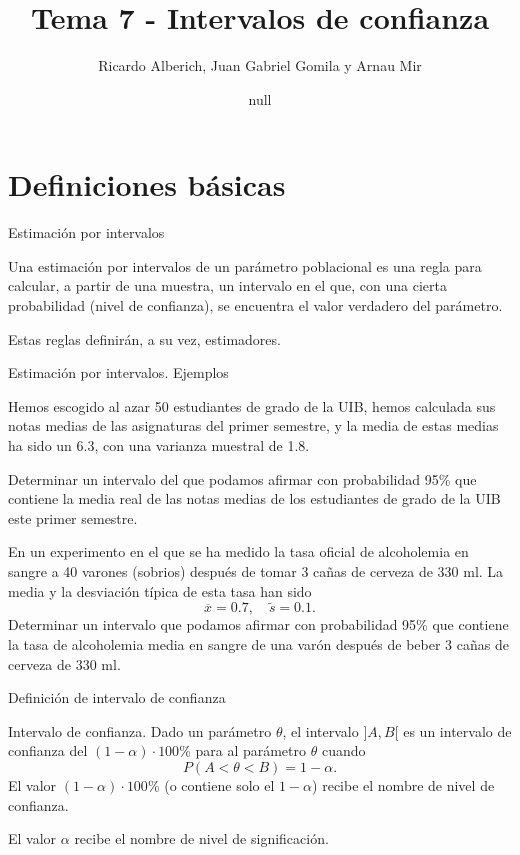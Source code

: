 \documentclass[ignorenonframetext,]{beamer}
\title{Tema 7 - Intervalos de confianza}
\author{Ricardo Alberich, Juan Gabriel Gomila y Arnau Mir}
\date{null}
\begin{document}
\frame{\titlepage}

\hypertarget{definiciones-basicas}{%
\section{Definiciones básicas}\label{definiciones-basicas}}

\begin{frame}{Estimación por intervalos}
\protect\hypertarget{estimacion-por-intervalos}{}

Una estimación por intervalos de un parámetro poblacional es una regla
para calcular, a partir de una muestra, un intervalo en el que, con una
cierta probabilidad (nivel de confianza), se encuentra el valor
verdadero del parámetro.

Estas reglas definirán, a su vez, estimadores.

\end{frame}

\begin{frame}{Estimación por intervalos. Ejemplos}
\protect\hypertarget{estimacion-por-intervalos.-ejemplos}{}

Hemos escogido al azar 50 estudiantes de grado de la UIB, hemos
calculada sus notas medias de las asignaturas del primer semestre, y la
media de estas medias ha sido un 6.3, con una varianza muestral de 1.8.

Determinar un intervalo del que podamos afirmar con probabilidad 95\%
que contiene la media real de las notas medias de los estudiantes de
grado de la UIB este primer semestre.

En un experimento en el que se ha medido la tasa oficial de alcoholemia
en sangre a 40 varones (sobrios) después de tomar 3 cañas de cerveza de
330 ml. La media y la desviación típica de esta tasa han sido \[
\overline{x}=0.7,\quad \widetilde{s}=0.1.
\] Determinar un intervalo que podamos afirmar con probabilidad 95\% que
contiene la tasa de alcoholemia media en sangre de una varón después de
beber 3 cañas de cerveza de 330 ml.

\end{frame}

\begin{frame}{Definición de intervalo de confianza}
\protect\hypertarget{definicion-de-intervalo-de-confianza}{}

Intervalo de confianza. Dado un parámetro \(\theta\), el intervalo
\(]A,B[\) es un intervalo de confianza del \((1-\alpha)\cdot 100\)\%
para al parámetro \(\theta\) cuando \[
P(A<\theta<B)=1-\alpha.
\] El valor \((1-\alpha)\cdot 100\)\% (o contiene solo el \(1-\alpha\))
recibe el nombre de nivel de confianza.

El valor \(\alpha\) recibe el nombre de nivel de significación.

\end{frame}
\end{document}
